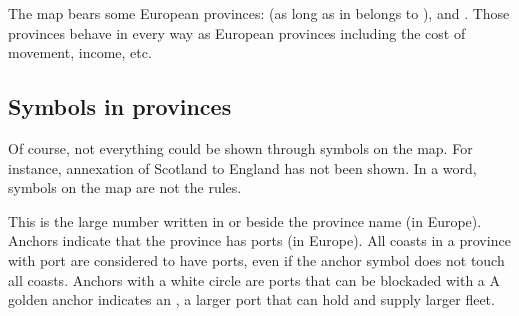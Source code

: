 \label{chBasics:Europe Provinces ROTW}
The \ROTW map bears some European provinces: \provinceHerat (as long as in
belongs to \paysPerse), \provinceCanarias and \provinceAcores. Those provinces
behave in every way as European provinces including the cost of movement,
income, etc.



\subsection{Symbols in provinces}

\begin{designnote}
  Of course, not everything could be shown through symbols on the map. For
  instance, annexation of Scotland to England has not been shown. In a word,
  symbols on the map are not the rules.
\end{designnote}
 This is the large number written in or beside the
province name (in Europe).
\aparag[Anchors] Anchors indicate that the province has ports (in Europe).
\bparag All coasts in a province with port are considered to have ports, even
if the anchor symbol does not touch all coasts. %
\bparag Anchors with a white circle are ports that can be blockaded with a
\Presidio%
\label{chBasics:Arsenal} A golden anchor indicates
an , a larger port that can hold and supply larger
fleet. %
